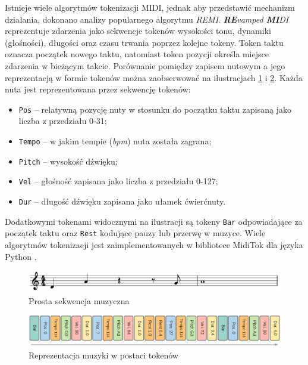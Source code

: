\documentclass[data-science]{agh-wi} %
\begin{document}
Istnieje wiele algorytmów tokenizacji MIDI, jednak aby przedstawić mechanizm działania, dokonano analizy popularnego algorytmu \textit{REMI}. \textit{\textbf{RE}vamped \textbf{MI}DI} reprezentuje zdarzenia jako sekwencje tokenów wysokości tonu, dynamiki (głośności), długości oraz czasu trwania poprzez kolejne tokeny. Token taktu oznacza początek nowego taktu, natomiast token pozycji określa miejsce zdarzenia w bieżącym takcie. Porównanie pomiędzy zapisem nutowym a jego reprezentacją w formie tokenów można zaobserwować na ilustracjach \ref*{fig:remi_notes} i \ref*{fig:remi_tokens}. Każda nuta jest reprezentowana przez sekwencję tokenów:
\begin{itemize}
    \item \texttt{Pos} -- relatywną pozycję nuty w stosunku do początku taktu zapisaną jako liczba z przedziału 0-31;
    \item \texttt{Tempo} -- w jakim tempie (\textit{bpm}) nuta została zagrana;
    \item \texttt{Pitch} -- wysokość dźwięku;
    \item \texttt{Vel} -- głośność zapisana jako liczba z przedziału 0-127;
    \item \texttt{Dur} -- długość dźwięku zapisana jako ułamek ćwierćnuty.
\end{itemize}
Dodatkowymi tokenami widocznymi na ilustracji są tokeny \texttt{Bar} odpowiadające za początek taktu oraz \texttt{Rest} kodujące pauzy lub przerwę w muzyce. Wiele algorytmów tokenizacji jest zaimplementowanych w bibliotece MidiTok dla języka Python \cite{miditok2021}.

\begin{figure}[ht!]
    \begin{center}
        \includegraphics[width=0.9\linewidth]{./img/tokenizer_notes.pdf}
    \end{center}
    \caption{Prosta sekwencja muzyczna}\label{fig:remi_notes}
\end{figure}

\begin{figure}[ht!]
    \begin{center}
        \includegraphics[width=0.9\linewidth]{./img/remi.png}
    \end{center}
    \caption{Reprezentacja muzyki w postaci tokenów}\label{fig:remi_tokens}
\end{figure}
\end{document}
